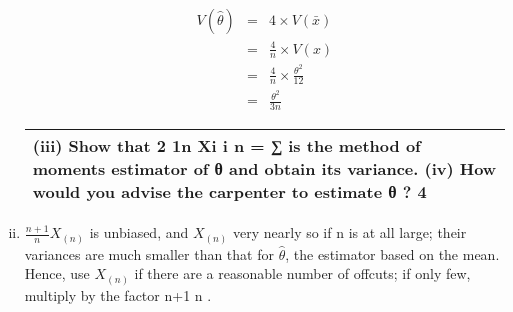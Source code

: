\documentclass[a4paper,12pt]{article}
\begin{document}
\begin{enumerate}[(i)]
\begin{eqnarray*}
V(\hat{\theta}) &=& 4 \times V(\bar{x})\\
 &=& \frac{4}{n} \times V(x) \\
 &=& \frac{4}{n} \times \frac{\theta^2}{12} \\
 &=& \frac{\theta^2}{3n}
\end{eqnarray*}
\newpage
  \begin{table}[ht!]
 \centering
 \begin{tabular}{|p{15cm}|}
 \hline  
(iii) Show that 
2 1n
Xi
i
n
= ∑ is the method of moments estimator of 
θ
 and obtain its variance.
(iv) How would you advise the carpenter to estimate 
θ
?
4\\ \hline
  \end{tabular}
\end{table}
\item $\displaystyle{ \frac{n+1}{n} X_{(n)}}$
is unbiased, and $X_{(n)}$ very nearly so if n is at all large; their
variances are much smaller than that for $\hat{\theta}$, the estimator based on the mean.
Hence, use $X_{(n)}$ if there are a reasonable number of offcuts; if only few,
multiply by the factor n+1
n .
\end{enumerate}
\end{document}
